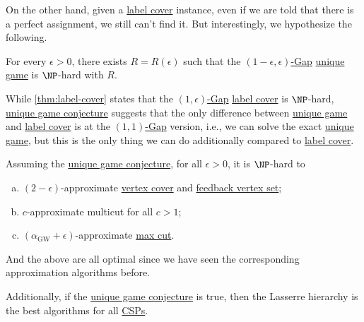 On the other hand, given a \hyperref[prb:label-cover]{label cover} instance, even if we are told that there is a perfect assignment, we still can't find it. But interestingly, we hypothesize the following.

\begin{conjecture}\label{conj:unique-game}
	For every \(\epsilon > 0\), there exists \(R = R(\epsilon )\) such that the \hyperref[def:c-s-Gap]{\((1-\epsilon , \epsilon )\)-Gap} \hyperref[prb:unique-game]{unique game} is \(\NP\)-hard with \(R\).
\end{conjecture}

While \autoref{thm:label-cover} states that the \hyperref[def:c-s-Gap]{\((1, \epsilon )\)-Gap} \hyperref[prb:label-cover]{label cover} is \(\NP\)-hard, \hyperref[conj:unique-game]{unique game conjecture} suggests that the only difference between \hyperref[prb:unique-game]{unique game} and \hyperref[prb:label-cover]{label cover} is at the \hyperref[def:c-s-Gap]{\((1, 1)\)-Gap} version, i.e., we can solve the exact \hyperref[prb:unique-game]{unique game}, but this is the only thing we can do additionally compared to \hyperref[prb:label-cover]{label cover}.

\begin{remark}
	Assuming the \hyperref[conj:unique-game]{unique game conjecture}, for all \(\epsilon > 0\), it is \(\NP\)-hard to
	\begin{enumerate}[(a)]
		\item \((2-\epsilon )\)-approximate \hyperref[prb:vertex-cover]{vertex cover} and \hyperref[prb:feedback-vertex-set]{feedback vertex set};
		\item \(c\)-approximate multicut for all \(c > 1\);
		\item \((\alpha _{\mathrm{GW} } + \epsilon )\)-approximate \hyperref[prb:max-cut]{max cut}.
	\end{enumerate}
	And the above are all optimal since we have seen the corresponding approximation algorithms before.
\end{remark}

Additionally, if the \hyperref[conj:unique-game]{unique game conjecture} is true, then the Lasserre hierarchy is the best algorithms for all \hyperref[prb:CSP]{CSPs}.